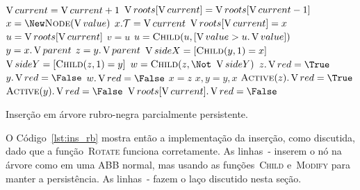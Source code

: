 \documentclass[main.tex]{subfiles}
\begin{document}
\begin{algorithm}
\begin{algorithmic}[1]

	\State $\operatorname{V}{current} = \operatorname{V}{current} + 1$
	\State $\operatorname{V}{roots}[\operatorname{V}{current}] = \operatorname{V}{roots}[\operatorname{V}{current} - 1]$
	\State $x = \New \Call{Node}{\val}$  \label{line:insrb:insb}
	\State $x.\mathcal{T} = \operatorname{V}{current}$
	\If{$\roots[\cur] = \Null$}
		\State $\operatorname{V}{roots}[\operatorname{V}{current}] = x$
	\Else
		\State $u = \operatorname{V}{roots}[\operatorname{V}{current}]$
		  \label{line:insrb:whilefind}
			\State $v = u$
			\State $u = \Call{Child}{u, [\val > u.\val]}$
		\EndWhile
		\State {}
	\EndIf \label{line:insrb:inse}
	 \label{line:insrb:loopb}
		\State $y = x.\operatorname{V}{parent}$ \label{line:insrb:xyzwb}
		\State $z = y.\operatorname{V}{parent}$
		\State $\V{sideX} = [\Call{Child}{y, 1} = x]$
		\State $\V{sideY} = [\Call{Child}{z, 1} = y]$ \label{line:insrb:xyzwe}
		\State $w = \Call{Child}{z, \Not\ \V{sideY}}$
		  \label{line:insrb:c1b}
			\State $z.\red = \True$
			\State $y.\red = \False$
			\State $w.\red = \False$
			\State $x = z$ \label{line:insrb:c1e}
		\Else
			  \label{line:insrb:c3b}
				\State {}
				\State $x, y = y, x$  \label{line:insrv:c3e}
			\EndIf
			\State {}  \label{line:insrb:c2b}
			\State $\Call{Active}{z}.\red = \True$ \label{line:insrb:act1}
			\State $\Call{Active}{y}.\red = \False$ \label{line:insrb:act2}
			\State \Break \label{line:insrb:c2e}
		\EndIf
	\EndWhile
	\State $\roots[\cur].\red = \False$  \label{line:insrb:loope}
\EndFunction
\end{algorithmic}
\caption{Inserção em árvore rubro-negra parcialmente persistente.} \label{lst:ins_rb}
\end{algorithm}

O Código~\ref{lst:ins_rb} mostra então a implementação da inserção, como discutida, dado que a função~\mbox{\textsc{Rotate}} funciona corretamente. As linhas~- inserem o nó na árvore como em uma ABB normal, mas usando as funções~\textsc{Child} e~\textsc{Modify} para manter a persistência. As linhas~- fazem o laço discutido nesta seção.
\end{document}
